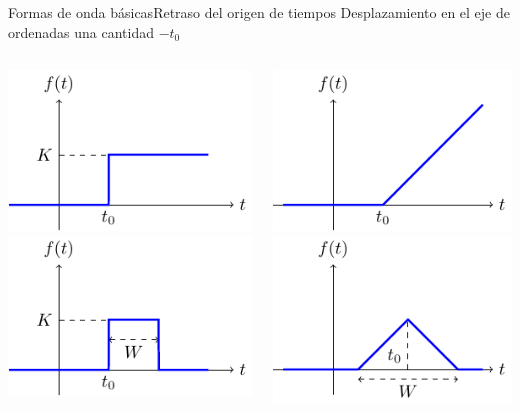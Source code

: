 \documentclass[aspectratio=169, xcolor={usenames,svgnames,dvipsnames}]{beamer}
\begin{document}
\begin{frame}{Formas de onda básicas}{Retraso del origen de tiempos}
Desplazamiento en el eje de ordenadas una cantidad $-t_0$
\begin{columns}
\begin{column}{0.5\linewidth}
\begin{center}
\includegraphics[height=0.35\textheight]{../figs/escalon_t0.pdf}\\
\includegraphics[height=0.35\textheight]{../figs/pulso_t0.pdf}
\end{center}
\end{column}
\begin{column}{0.5\linewidth}
\begin{center}
\includegraphics[height=0.35\textheight]{../figs/rampa_t0.pdf}\\
\includegraphics[height=0.35\textheight]{../figs/triangular_t0.pdf}
\end{center}
\end{column}
\end{columns}
\end{frame}
\end{document}
